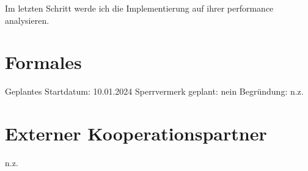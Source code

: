\documentclass{article}
\begin{document}
Im letzten Schritt werde ich die Implementierung auf ihrer performance analysieren.


\section{Formales}
Geplantes Startdatum: 10.01.2024
\linebreak
Sperrvermerk geplant: nein
\linebreak
Begründung: n.z.

\section{Externer Kooperationspartner}
n.z.

\printbibliography
\end{document}
